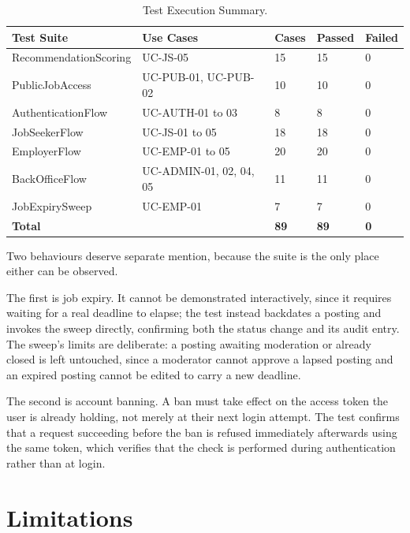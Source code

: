 \begin{table}[H]
	\centering
	\caption{Test Execution Summary.}
	\label{tab:test-results}
	\begin{tabular}{|p{4.6cm}|p{4.0cm}|p{1.5cm}|p{1.5cm}|p{1.5cm}|}
		\hline
		\textbf{Test Suite} & \textbf{Use Cases} & \textbf{Cases} & \textbf{Passed} & \textbf{Failed} \\
		\hline
		RecommendationScoring & UC-JS-05 & 15 & 15 & 0 \\
		\hline
		PublicJobAccess & UC-PUB-01, UC-PUB-02 & 10 & 10 & 0 \\
		\hline
		AuthenticationFlow & UC-AUTH-01 to 03 & 8 & 8 & 0 \\
		\hline
		JobSeekerFlow & UC-JS-01 to 05 & 18 & 18 & 0 \\
		\hline
		EmployerFlow & UC-EMP-01 to 05 & 20 & 20 & 0 \\
		\hline
		BackOfficeFlow & UC-ADMIN-01, 02, 04, 05 & 11 & 11 & 0 \\
		\hline
		JobExpirySweep & UC-EMP-01 & 7 & 7 & 0 \\
		\hline
		\textbf{Total} & & \textbf{89} & \textbf{89} & \textbf{0} \\
		\hline
	\end{tabular}
\end{table}

Two behaviours deserve separate mention, because the suite is the only place either can be observed.

The first is job expiry. It cannot be demonstrated interactively, since it requires waiting for a real deadline to elapse; the test instead backdates a posting and invokes the sweep directly, confirming both the status change and its audit entry. The sweep's limits are deliberate: a posting awaiting moderation or already closed is left untouched, since a moderator cannot approve a lapsed posting and an expired posting cannot be edited to carry a new deadline.

The second is account banning. A ban must take effect on the access token the user is already holding, not merely at their next login attempt. The test confirms that a request succeeding before the ban is refused immediately afterwards using the same token, which verifies that the check is performed during authentication rather than at login.

\section{Limitations}

